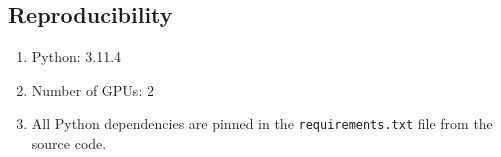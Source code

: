 \documentclass[draft]{article}
\begin{document}
\begin{appendices}
    \section{Reproducibility}
    \begin{enumerate}
        \item Python: 3.11.4

        \item Number of GPUs: 2
        
        \item All Python dependencies are pinned in the \texttt{requirements.txt} file from the source code. 
    \end{enumerate}


\end{appendices}



\end{document}
